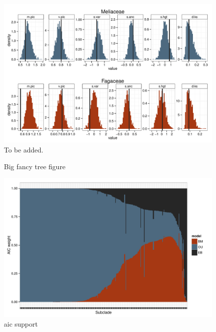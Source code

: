 \documentclass[a4paper,12pt]{article}
\begin{document}
\begin{figure}[p]
  \centering
  \includegraphics[scale=0.65]{figs/two-clade-example}
  \caption{To be added.}
  \label{fig:two-clades}
\end{figure}

\begin{figure}[p]
  \centering
  \caption{Big fancy tree figure}
  \label{fig:angio-phylogeny}
\end{figure}

\begin{figure}[p]
  \centering
  \includegraphics[angle=90, origin=c, scale=0.9]{figs/AIC-support}
  \caption{aic support}
  \label{fig:aic-support}
\end{figure}
\end{document}
